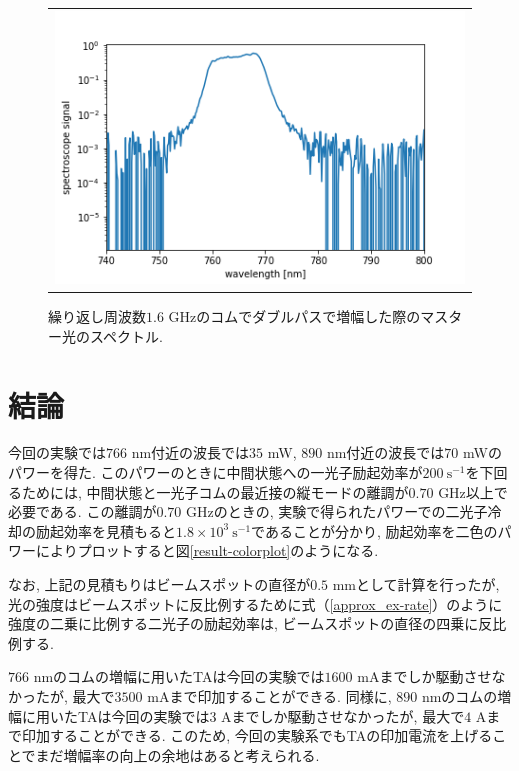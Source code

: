 \documentclass[uplatex, dvipdfmx, a4paper, report, papersize, 11pt]{jsbook}
\begin{document}
\begin{figure}[H]
  \centering
    \begin{tabular}{c}
      \begin{minipage}{1\hsize}
        \centering
          \includegraphics[keepaspectratio,  scale=0.5,  angle=0]
          {figures/chapter4/doublepass_master.png}
          \caption{繰り返し周波数$1.6$ GHzのコムでダブルパスで増幅した際のマスター光のスペクトル. }
          \label{doublepass_master}
      \end{minipage}
    \end{tabular}
\end{figure}

\section{結論}

今回の実験では$766$ nm付近の波長では$35$ mW, $890$ nm付近の波長では$70$ mWのパワーを得た. このパワーのときに中間状態への一光子励起効率が$200\ \mathrm{s^{-1}}$を下回るためには, 中間状態と一光子コムの最近接の縦モードの離調が$0.70$ GHz以上で必要である. この離調が$0.70$ GHzのときの, 実験で得られたパワーでの二光子冷却の励起効率を見積もると$1.8\times10^3\ \mathrm{s^{-1}}$であることが分かり, 励起効率を二色のパワーによりプロットすると図\ref{result-colorplot}のようになる. \par
なお, 上記の見積もりはビームスポットの直径が$0.5$ mmとして計算を行ったが, 光の強度はビームスポットに反比例するために式（\ref{approx_ex-rate}）のように強度の二乗に比例する二光子の励起効率は, ビームスポットの直径の四乗に反比例する. \par
$766$ nmのコムの増幅に用いたTAは今回の実験では$1600$ mAまでしか駆動させなかったが, 最大で$3500$ mAまで印加することができる. 同様に, $890$ nmのコムの増幅に用いたTAは今回の実験では$3$ Aまでしか駆動させなかったが, 最大で$4$ Aまで印加することができる. このため, 今回の実験系でもTAの印加電流を上げることでまだ増幅率の向上の余地はあると考えられる. \par
\end{document}
